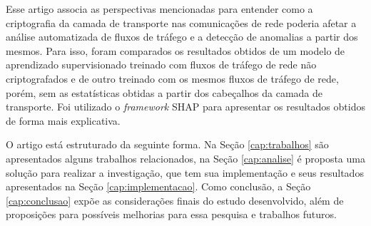 \documentclass[12pt]{article}
\begin{document}

Esse artigo associa as perspectivas mencionadas para entender como a criptografia da camada de transporte nas comunicações de rede poderia afetar a análise automatizada de fluxos de tráfego e a detecção de anomalias a partir dos mesmos. Para isso, foram comparados os resultados obtidos de um modelo de aprendizado supervisionado treinado com fluxos de tráfego de rede não criptografados e de outro treinado com os mesmos fluxos de tráfego de rede, porém, sem as estatísticas obtidas a partir dos cabeçalhos da camada de transporte. Foi utilizado o \emph{framework} SHAP \cite{lundberg2017unified} para apresentar os resultados obtidos de forma mais explicativa.

O artigo está estruturado da seguinte forma. Na Seção \ref{cap:trabalhos} são apresentados alguns trabalhos relacionados, na Seção \ref{cap:analise} é proposta uma solução para realizar a investigação, que tem sua implementação e seus resultados apresentados na Seção \ref{cap:implementacao}. Como conclusão, a Seção \ref{cap:conclusao} expõe as considerações finais do estudo desenvolvido, além de proposições para possíveis melhorias para essa pesquisa e trabalhos futuros.


\end{document}
